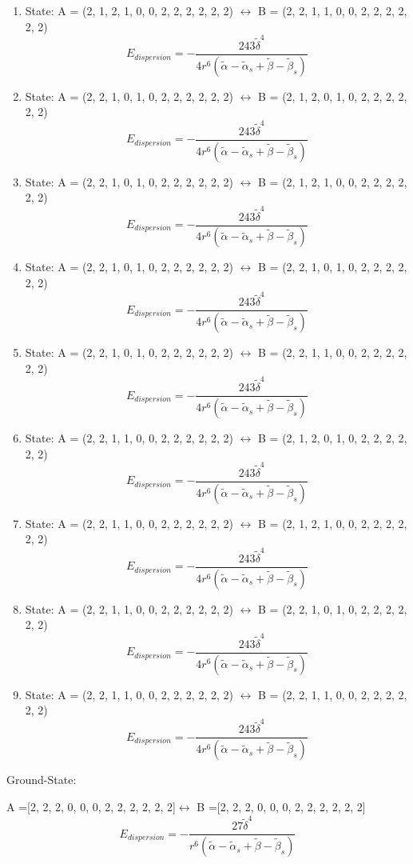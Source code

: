 \documentclass[12pt,a4paper]{article}
\begin{document}
\begin{enumerate}
$$E_{dispersion} =- \frac{243 \tilde{\delta}^{4}}{4 r^{6} \left(\tilde{\alpha} - \tilde{\alpha}_{s} + \tilde{\beta} - \tilde{\beta}_{s}\right)}$$
 \item State: A = (2, 1, 2, 1, 0, 0, 2, 2, 2, 2, 2, 2) $\leftrightarrow$ B = (2, 2, 1, 1, 0, 0, 2, 2, 2, 2, 2, 2) 
$$E_{dispersion} =- \frac{243 \tilde{\delta}^{4}}{4 r^{6} \left(\tilde{\alpha} - \tilde{\alpha}_{s} + \tilde{\beta} - \tilde{\beta}_{s}\right)}$$
 \item State: A = (2, 2, 1, 0, 1, 0, 2, 2, 2, 2, 2, 2) $\leftrightarrow$ B = (2, 1, 2, 0, 1, 0, 2, 2, 2, 2, 2, 2) 
$$E_{dispersion} =- \frac{243 \tilde{\delta}^{4}}{4 r^{6} \left(\tilde{\alpha} - \tilde{\alpha}_{s} + \tilde{\beta} - \tilde{\beta}_{s}\right)}$$
 \item State: A = (2, 2, 1, 0, 1, 0, 2, 2, 2, 2, 2, 2) $\leftrightarrow$ B = (2, 1, 2, 1, 0, 0, 2, 2, 2, 2, 2, 2) 
$$E_{dispersion} =- \frac{243 \tilde{\delta}^{4}}{4 r^{6} \left(\tilde{\alpha} - \tilde{\alpha}_{s} + \tilde{\beta} - \tilde{\beta}_{s}\right)}$$
 \item State: A = (2, 2, 1, 0, 1, 0, 2, 2, 2, 2, 2, 2) $\leftrightarrow$ B = (2, 2, 1, 0, 1, 0, 2, 2, 2, 2, 2, 2) 
$$E_{dispersion} =- \frac{243 \tilde{\delta}^{4}}{4 r^{6} \left(\tilde{\alpha} - \tilde{\alpha}_{s} + \tilde{\beta} - \tilde{\beta}_{s}\right)}$$
 \item State: A = (2, 2, 1, 0, 1, 0, 2, 2, 2, 2, 2, 2) $\leftrightarrow$ B = (2, 2, 1, 1, 0, 0, 2, 2, 2, 2, 2, 2) 
$$E_{dispersion} =- \frac{243 \tilde{\delta}^{4}}{4 r^{6} \left(\tilde{\alpha} - \tilde{\alpha}_{s} + \tilde{\beta} - \tilde{\beta}_{s}\right)}$$
 \item State: A = (2, 2, 1, 1, 0, 0, 2, 2, 2, 2, 2, 2) $\leftrightarrow$ B = (2, 1, 2, 0, 1, 0, 2, 2, 2, 2, 2, 2) 
$$E_{dispersion} =- \frac{243 \tilde{\delta}^{4}}{4 r^{6} \left(\tilde{\alpha} - \tilde{\alpha}_{s} + \tilde{\beta} - \tilde{\beta}_{s}\right)}$$
 \item State: A = (2, 2, 1, 1, 0, 0, 2, 2, 2, 2, 2, 2) $\leftrightarrow$ B = (2, 1, 2, 1, 0, 0, 2, 2, 2, 2, 2, 2) 
$$E_{dispersion} =- \frac{243 \tilde{\delta}^{4}}{4 r^{6} \left(\tilde{\alpha} - \tilde{\alpha}_{s} + \tilde{\beta} - \tilde{\beta}_{s}\right)}$$
 \item State: A = (2, 2, 1, 1, 0, 0, 2, 2, 2, 2, 2, 2) $\leftrightarrow$ B = (2, 2, 1, 0, 1, 0, 2, 2, 2, 2, 2, 2) 
$$E_{dispersion} =- \frac{243 \tilde{\delta}^{4}}{4 r^{6} \left(\tilde{\alpha} - \tilde{\alpha}_{s} + \tilde{\beta} - \tilde{\beta}_{s}\right)}$$
 \item State: A = (2, 2, 1, 1, 0, 0, 2, 2, 2, 2, 2, 2) $\leftrightarrow$ B = (2, 2, 1, 1, 0, 0, 2, 2, 2, 2, 2, 2) 
$$E_{dispersion} =- \frac{243 \tilde{\delta}^{4}}{4 r^{6} \left(\tilde{\alpha} - \tilde{\alpha}_{s} + \tilde{\beta} - \tilde{\beta}_{s}\right)}$$
\end{enumerate}
Ground-State:

A =[2, 2, 2, 0, 0, 0, 2, 2, 2, 2, 2, 2]$\leftrightarrow$ B =[2, 2, 2, 0, 0, 0, 2, 2, 2, 2, 2, 2]
$$E_{dispersion} =
- \frac{27 \tilde{\delta}^{4}}{r^{6} \left(\tilde{\alpha} - \tilde{\alpha}_{s} + \tilde{\beta} - \tilde{\beta}_{s}\right)}$$
\end{document}
